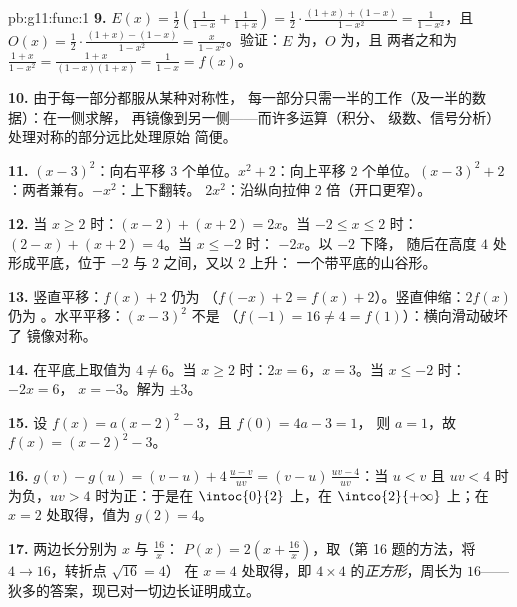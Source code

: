 \begin{solution}{pb:g11:func:1}
\textbf{9.} $E(x) = \frac12\left(\frac{1}{1 - x} + \frac{1}{1 +
x}\right) = \frac12 \cdot \frac{(1 + x) + (1 - x)}{1 - x^2}
= \frac{1}{1 - x^2}$，且
$O(x) = \frac12 \cdot \frac{(1 + x) - (1 - x)}{1 - x^2}
= \frac{x}{1 - x^2}$。验证：$E$ 为，$O$ 为，且
两者之和为 $\frac{1 + x}{1 - x^2} =
\frac{1 + x}{(1 - x)(1 + x)} = \frac{1}{1 - x} = f(x)$。

\textbf{10.} 由于每一部分都服从某种对称性，
每一部分只需一半的工作（及一半的数据）：在一侧求解，
再镜像到另一侧——而许多运算（积分、
级数、信号分析）处理对称的部分远比处理原始
简便。

\textbf{11.} $(x-3)^2$：向右平移 $3$ 个单位。$x^2 + 2$：向上平移
$2$ 个单位。$(x-3)^2 + 2$：两者兼有。$-x^2$：上下翻转。
$2x^2$：沿纵向拉伸 $2$ 倍（开口更窄）。

\textbf{12.} 当 $x \geq 2$ 时：$(x - 2) + (x + 2) = 2x$。当
$-2 \leq x \leq 2$ 时：$(2 - x) + (x + 2) = 4$。当 $x \leq -2$ 时：
$-2x$。以 $-2$ 下降，
随后在高度 $4$ 处形成平底，位于 $-2$ 与 $2$ 之间，又以 $2$ 上升：
一个带平底的山谷形。

\textbf{13.} 竖直平移：$f(x) + 2$ 仍为
（$f(-x) + 2 = f(x) + 2$）。竖直伸缩：$2f(x)$ 仍为
。水平平移：$(x - 3)^2$ 不是
（$f(-1) = 16 \neq 4 = f(1)$）：横向滑动破坏了
镜像对称。

\textbf{14.} 在平底上取值为 $4 \neq 6$。当
$x \geq 2$ 时：$2x = 6$，$x = 3$。当 $x \leq -2$ 时：$-2x = 6$，
$x = -3$。解为 $\pm 3$。

\textbf{15.} 设 $f(x) = a(x - 2)^2 - 3$，且 $f(0) = 4a - 3 = 1$，
则 $a = 1$，故 $f(x) = (x - 2)^2 - 3$。

\textbf{16.} $g(v) - g(u) = (v - u) + 4\,\frac{u - v}{uv}
= (v - u)\,\frac{uv - 4}{uv}$：当 $u < v$ 且
$uv < 4$ 时为负，$uv > 4$ 时为正：于是在
$\intoc{0}{2}$ 上，在 $\intco{2}{+\infty}$ 上；在
$x = 2$ 处取得，值为 $g(2) = 4$。

\textbf{17.} 两边长分别为 $x$ 与 $\frac{16}{x}$：
$P(x) = 2\left(x + \frac{16}{x}\right)$，取（第
16 题的方法，将 $4 \to 16$，转折点 $\sqrt{16} = 4$）
在 $x = 4$ 处取得，即 $4 \times 4$ 的\emph{正方形}，周长为 $16$——
狄多的答案，现已对一切边长证明成立。


\end{solution}
